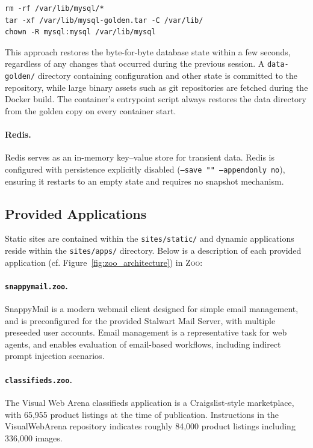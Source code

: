 \documentclass{article} %
\newcommand{\zoo}{\textsc{Zoo}}
\begin{document}
\begin{lstlisting}
rm -rf /var/lib/mysql/*
tar -xf /var/lib/mysql-golden.tar -C /var/lib/
chown -R mysql:mysql /var/lib/mysql
\end{lstlisting}

This approach restores the byte-for-byte database state within a few seconds, regardless of any changes that occurred during the previous session.
A \texttt{data-golden/} directory containing configuration and other state is committed to the repository, while large binary assets such as git repositories are fetched during the Docker build.
The container's entrypoint script always restores the data directory from the golden copy on every container start.

\paragraph{Redis.}
Redis \citep{redis} serves as an in-memory key--value store for transient data.
Redis is configured with persistence explicitly disabled (\texttt{--save "" --appendonly no}), ensuring it restarts to an empty state and requires no snapshot mechanism.

\subsection{Provided Applications}
\label{sec:provided_applications}

Static sites are contained within the \texttt{sites/static/} and dynamic applications reside within the \texttt{sites/apps/} directory.
Below is a description of each provided application (cf. Figure~\ref{fig:zoo_architecture}) in \zoo{}:

\paragraph{\texttt{snappymail.zoo}.}
SnappyMail \citep{snappymail} is a modern webmail client designed for simple email management, and is preconfigured for the provided Stalwart Mail Server, with multiple preseeded user accounts.
Email management is a representative task for web agents, and enables evaluation of email-based workflows, including indirect prompt injection scenarios.

\paragraph{\texttt{classifieds.zoo}.}
The Visual Web Arena \citep{visualwebarena} classifieds application is a Craigslist-style marketplace, with 65,955 product listings at the time of publication.
Instructions in the VisualWebArena repository \citep{visual_webarena} indicates roughly 84,000 product listings including 336,000 images.
\end{document}
